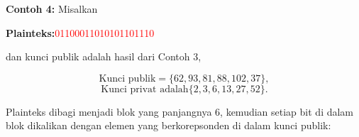\documentclass{article}
\begin{document}

\textbf{Contoh 4:} Misalkan

\textbf{Plainteks:}\textcolor{red}{01100011010101101110}

dan kunci publik adalah hasil dari Contoh 3,

\[ \text{Kunci publik} = \{62, 93, 81, 88, 102, 37\}, \]
\[ \text{Kunci privat adalah} \{2, 3, 6, 13, 27, 52\}. \]

Plainteks dibagi menjadi blok yang panjangnya 6, kemudian setiap bit di dalam blok dikalikan dengan elemen yang berkorepsonden di dalam kunci publik:
\end{document}
